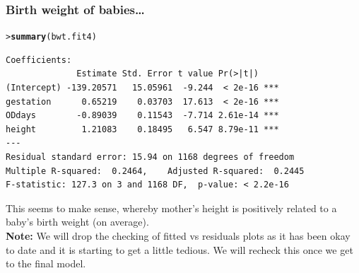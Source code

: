 \documentclass{beamer}\usepackage[]{graphicx}\usepackage[]{xcolor}
\makeatletter
\newcommand{\hlstd}[1]{\textcolor[rgb]{0.345,0.345,0.345}{#1}}%
\newcommand{\hlkwd}[1]{\textcolor[rgb]{0.737,0.353,0.396}{\textbf{#1}}}%
\newenvironment{kframe}{%
 \def\at@end@of@kframe{}%
 \ifinner\ifhmode%
  \def\at@end@of@kframe{\end{minipage}}%
  \begin{minipage}{\columnwidth}%
 \fi\fi%
 \def\FrameCommand##1{\hskip\@totalleftmargin \hskip-\fboxsep
 \colorbox{shadecolor}{##1}\hskip-\fboxsep
     \hskip-\linewidth \hskip-\@totalleftmargin \hskip\columnwidth}%
 \MakeFramed {\advance\hsize-\width
   \@totalleftmargin\z@ \linewidth\hsize
   \@setminipage}}%
 {\par\unskip\endMakeFramed%
 \at@end@of@kframe}
\newenvironment{knitrout}{}{} %
\makeatother
\begin{document}
\begin{frame}[fragile]

\frametitle{Birth weight of babies\ldots}
\begin{knitrout}\scriptsize
{}\color{fgcolor}\begin{kframe}
\begin{alltt}
\hlstd{> }\hlkwd{summary}\hlstd{(bwt.fit4)}
\end{alltt}
\end{kframe}
\end{knitrout}

\begin{knitrout}\scriptsize
{}\color{fgcolor}\begin{kframe}
\begin{verbatim}
Coefficients:
              Estimate Std. Error t value Pr(>|t|)    
(Intercept) -139.20571   15.05961  -9.244  < 2e-16 ***
gestation      0.65219    0.03703  17.613  < 2e-16 ***
ODdays        -0.89039    0.11543  -7.714 2.61e-14 ***
height         1.21083    0.18495   6.547 8.79e-11 ***
---
Residual standard error: 15.94 on 1168 degrees of freedom
Multiple R-squared:  0.2464,	Adjusted R-squared:  0.2445 
F-statistic: 127.3 on 3 and 1168 DF,  p-value: < 2.2e-16
\end{verbatim}
\end{kframe}
\end{knitrout}
\bigskip
This seems to make sense, whereby mother's height is positively related to a baby's birth weight (on average).\\
\bigskip
\textbf{Note:} We will drop the checking of fitted vs residuals plots as it has been okay to date and it is starting to get a little tedious. We will recheck this once we get to the final model.
\end{frame}
\end{document}

